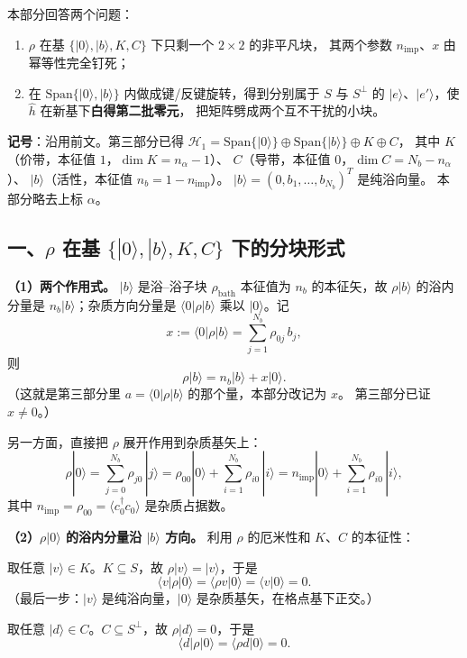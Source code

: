 \documentclass[11pt]{ctexart}
\begin{document}
\noindent 本部分回答两个问题：
\begin{enumerate}
\item $\rho$ 在基 $\{|0\rangle,|b\rangle,K,C\}$ 下只剩一个 $2\times2$ 的非平凡块，
其两个参数 $n_{\mathrm{imp}}$、$x$ 由幂等性完全钉死；
\item 在 $\mathrm{Span}\{|0\rangle,|b\rangle\}$ 内做成键/反键旋转，得到分别属于
$S$ 与 $S^{\perp}$ 的 $|e\rangle$、$|e'\rangle$，使 $\hat h$ 在新基下\textbf{白得第二批零元}，
把矩阵劈成两个互不干扰的小块。
\end{enumerate}

\medskip
\noindent\textbf{记号}：沿用前文。第三部分已得
$\mathcal{H}_1=\mathrm{Span}\{|0\rangle\}\oplus\mathrm{Span}\{|b\rangle\}\oplus K\oplus C$，
其中 $K$（价带，本征值 $1$，$\dim K=n_\alpha-1$）、
$C$（导带，本征值 $0$，$\dim C=N_b-n_\alpha$）、
$|b\rangle$（活性，本征值 $n_b=1-n_{\mathrm{imp}}$）。
$|b\rangle=(0,b_1,\dots,b_{N_b})^T$ 是纯浴向量。
本部分略去上标 $\alpha$。

\subsection{一、$\rho$ 在基 $\{|0\rangle,|b\rangle,K,C\}$ 下的分块形式}

\textbf{（1）两个作用式。}
$|b\rangle$ 是浴--浴子块 $\rho_{\mathrm{bath}}$ 本征值为 $n_b$ 的本征矢，故
$\rho|b\rangle$ 的浴内分量是 $n_b|b\rangle$；杂质方向分量是
$\langle0|\rho|b\rangle$ 乘以 $|0\rangle$。记
\[
x:=\langle0|\rho|b\rangle
=\sum_{j=1}^{N_b}\rho_{0j}\,b_j ,
\]
则
\[
\rho|b\rangle=n_b|b\rangle+x|0\rangle .
\]
（这就是第三部分里 $a=\langle0|\rho|b\rangle$ 的那个量，本部分改记为 $x$。
第三部分已证 $x\neq0$。）

另一方面，直接把 $\rho$ 展开作用到杂质基矢上：
\[
\rho|0\rangle
=
\sum_{j=0}^{N_b}\rho_{j0}\,|j\rangle
=
\rho_{00}|0\rangle+\sum_{i=1}^{N_b}\rho_{i0}\,|i\rangle
=
n_{\mathrm{imp}}|0\rangle+\sum_{i=1}^{N_b}\rho_{i0}\,|i\rangle ,
\]
其中 $n_{\mathrm{imp}}=\rho_{00}=\langle c_0^{\dagger}c_0\rangle$ 是杂质占据数。

\textbf{（2）$\rho|0\rangle$ 的浴内分量沿 $|b\rangle$ 方向。}
利用 $\rho$ 的厄米性和 $K$、$C$ 的本征性：

取任意 $|v\rangle\in K$。$K\subseteq S$，故 $\rho|v\rangle=|v\rangle$，于是
\[
\langle v|\rho|0\rangle
=
\langle \rho v|0\rangle
=
\langle v|0\rangle
=
0 .
\]
（最后一步：$|v\rangle$ 是纯浴向量，$|0\rangle$ 是杂质基矢，在格点基下正交。）

取任意 $|d\rangle\in C$。$C\subseteq S^{\perp}$，故 $\rho|d\rangle=0$，于是
\[
\langle d|\rho|0\rangle
=
\langle \rho d|0\rangle
=
0 .
\]
\end{document}
